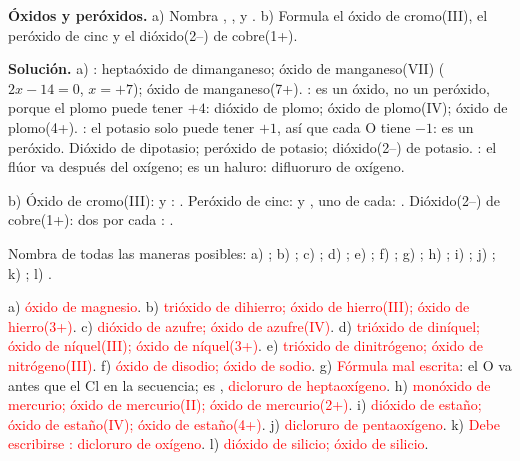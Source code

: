 \begin{example}
    \textbf{Óxidos y peróxidos.} a) Nombra , ,  y . b) Formula el óxido de cromo(III), el
    peróxido de cinc y el dióxido(2\nobreakdash--) de cobre(1+).

    \textbf{Solución.} a) : heptaóxido de dimanganeso; óxido de manganeso(VII) (\(2x - 14 = 0\), \(x = +7\)); óxido
    de manganeso(7+). : es un óxido, no un peróxido, porque el plomo puede tener \(+4\): dióxido de plomo; óxido de
    plomo(IV); óxido de plomo(4+). : el potasio solo puede tener \(+1\), así que cada O tiene \(-1\): es un peróxido.
    Dióxido de dipotasio; peróxido de potasio; dióxido(2\nobreakdash--) de potasio. : el flúor va después del oxígeno; es un
    haluro: difluoruro de oxígeno.

    b) Óxido de cromo(III):  y : . Peróxido de cinc:  y , uno de cada:
    . Dióxido(2\nobreakdash--) de cobre(1+): dos  por cada : .
\end{example}

\begin{exercise}
    Nombra de todas las maneras posibles: a) ; b) ; c) ; d) ; e) ; f) ;
    g) ; h) ; i) ; j) ; k) ; l) .
    \begin{solu}
        a) \textcolor{red}{óxido de magnesio}. b) \textcolor{red}{trióxido de dihierro; óxido de hierro(III); óxido de
        hierro(3+)}. c) \textcolor{red}{dióxido de azufre; óxido de azufre(IV)}. d) \textcolor{red}{trióxido de diníquel; óxido de
        níquel(III); óxido de níquel(3+)}. e) \textcolor{red}{trióxido de dinitrógeno; óxido de nitrógeno(III)}. f)
        \textcolor{red}{óxido de disodio; óxido de sodio}. g) \textcolor{red}{Fórmula mal escrita}: el O va antes que el Cl en
        la secuencia; es , \textcolor{red}{dicloruro de heptaoxígeno}. h) \textcolor{red}{monóxido de mercurio; óxido
        de mercurio(II); óxido de mercurio(2+)}. i) \textcolor{red}{dióxido de estaño; óxido de estaño(IV); óxido de
        estaño(4+)}. j) \textcolor{red}{dicloruro de pentaoxígeno}. k) \textcolor{red}{Debe escribirse : dicloruro de
        oxígeno}. l) \textcolor{red}{dióxido de silicio; óxido de silicio}.
    \end{solu}
\end{exercise}


